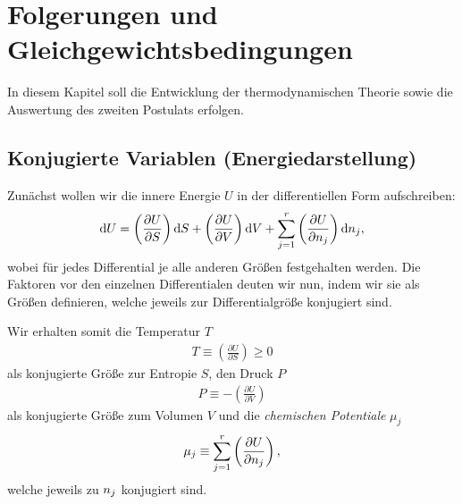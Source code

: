 
\chapter{Folgerungen und Gleichgewichtsbedingungen}

In diesem Kapitel soll die Entwicklung der thermodynamischen Theorie sowie die Auswertung des zweiten Postulats erfolgen.

\section{Konjugierte Variablen (Energiedarstellung)}

Zunächst wollen wir die innere Energie $U$ in der differentiellen Form aufschreiben:
\begin{align*}
    \mathop{}\!\mathrm{d} U = \left(\frac{\partial U}{\partial S}\right) \mathop{}\!\mathrm{d} S + \left(\frac{\partial U}{\partial V}\right) \mathop{}\!\mathrm{d} V + \sum_{j = 1}^r \left(\frac{\partial U}{\partial n_j}\right) \mathop{}\!\mathrm{d} n_j,
\end{align*}
wobei für jedes Differential je alle anderen Größen festgehalten werden. 
Die Faktoren vor den einzelnen Differentialen deuten wir nun, indem wir sie als Größen definieren, welche jeweils zur Differentialgröße konjugiert sind.

Wir erhalten somit die Temperatur $T$
\begin{align}
    \label{eq:def_temperatur}
    T \equiv \left(\frac{\partial U}{\partial S}\right) \geq 0
\end{align}
als konjugierte Größe zur Entropie $S$, den Druck $P$
\begin{align}
    \label{eq:def_druck}
    P \equiv -\left(\frac{\partial U}{\partial V}\right)
\end{align}
als konjugierte Größe zum Volumen $V$ und die \emph{chemischen Potentiale} $\mu_j$
\begin{align}
    \label{eq:def_chemische_potentiale}
    \mu_j \equiv \sum_{j = 1}^r \left(\frac{\partial U}{\partial n_j}\right),
\end{align}
welche jeweils zu $n_j$ konjugiert sind.

